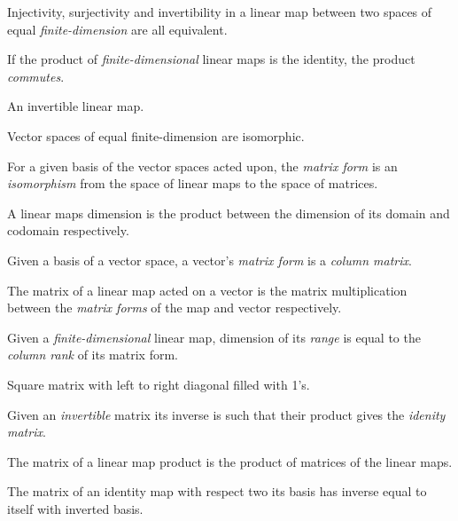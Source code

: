 \begin{multicols}{3}
  Injectivity, surjectivity and invertibility in a linear map between two spaces of equal \textit{finite-dimension} are all equivalent.

  If the product of \textit{finite-dimensional} linear maps is the identity, the product \textit{commutes}.

  An invertible linear map.

  Vector spaces of equal finite-dimension are isomorphic.

  For a given basis of the vector spaces acted upon, the \textit{matrix form} is an
  \textit{isomorphism} from the space of linear maps to the space of matrices.

  A linear maps dimension is the product between the dimension of its domain and codomain respectively.

  Given a basis of a vector space, a vector's \textit{matrix form} is a \textit{column matrix}.

  
  The matrix of a linear map acted on a vector is the matrix multiplication between
  the \textit{matrix forms} of the map and vector respectively.
  
  Given a \textit{finite-dimensional} linear map,
  dimension of its \textit{range} is equal to the \textit{column rank} of its matrix form.
  
  Square matrix with left to right diagonal filled with 1's.

  Given an \textit{invertible} matrix its inverse is such that their product gives the \textit{idenity matrix}.

  The matrix of a linear map product is the product of matrices of the linear maps.
  
  The matrix of an identity map with respect two its basis
  has inverse equal to itself with inverted basis.
  

\end{multicols}
